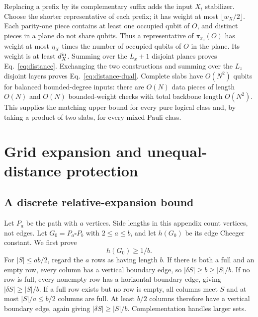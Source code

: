 Replacing a prefix by its complementary suffix adds the input $X_i$
stabilizer. Choose the shorter representative of each prefix; it has
weight at most $\lfloor w_X/2\rfloor$. Each parity-one piece contains
at least one occupied qubit of $O$, and distinct pieces in a plane do
not share qubits. Thus a representative of $\pi_{x_0}(O)$ has weight at
most $\eta_X$ times the number of occupied qubits of $O$ in the plane.
Its weight is at least $d_X^{\rm in}$. Summing over the $L_x+1$ disjoint
planes proves Eq.~\eqref{eq:distance}. Exchanging the two constructions
and summing over the $L_z$ disjoint layers proves
Eq.~\eqref{eq:distance-dual}. Complete slabs have $O(N^2)$ qubits for
balanced bounded-degree inputs: there are $O(N)$ data pieces of length
$O(N)$ and $O(N)$ bounded-weight checks with total backbone length
$O(N^2)$. This supplies the matching upper bound for every pure logical
class and, by taking a product of two slabs, for every mixed Pauli class.

\section{Grid expansion and unequal-distance protection}
\label{app:expansion}

\subsection{A discrete relative-expansion bound}
Let $P_a$ be the path with $a$ vertices. Side lengths in this appendix
count vertices, not edges. Let $G_0=P_a\square P_b$ with $2\le a\le b$,
and let $h(G_0)$ be its edge Cheeger constant. We first prove
\begin{equation}
 h(G_0)\ge 1/b.
\end{equation}
For $|S|\le ab/2$, regard the $a$ rows as having length $b$. If there is
both a full and an empty row, every column has a vertical boundary edge,
so $|\delta S|\ge b\ge |S|/b$. If no row is full, every nonempty row
has a horizontal boundary edge, giving $|\delta S|\ge |S|/b$.
If a full row exists but no row is empty, all columns meet $S$ and at
most $|S|/a\le b/2$ columns are full. At least $b/2$ columns therefore
have a vertical boundary edge, again giving $|\delta S|\ge |S|/b$.
Complementation handles larger sets.

